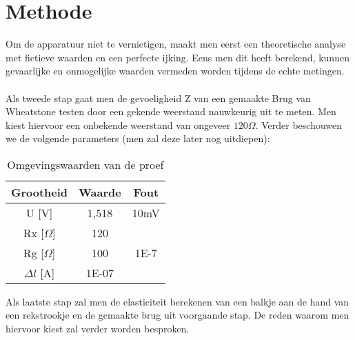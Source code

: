 \section{Methode}

Om de apparatuur niet te vernietigen, maakt men
eerst een theoretische analyse met fictieve waarden en een 
perfecte ijking. Eens men dit heeft berekend, kunnen
gevaarlijke en onmogelijke waarden vermeden worden tijdens de echte metingen.
\\ \\
Als tweede stap gaat men de gevoeligheid Z van een gemaakte Brug
van Wheatstone testen door een gekende weerstand nauwkeurig uit
te meten. Men kiest hiervoor een onbekende weerstand van
ongeveer $120 \Omega$. Verder beschouwen we de volgende parameters
(men zal deze later nog uitdiepen):

\begin{table}[h]
    \caption{Omgevingswaarden van de proef}
    \label{tab:omgevingswaarden}
    \centering
    \begin{tabular}{| c | c | c |}
        \hline
        Grootheid       & Waarde    & Fout \\ \hline
        U [V]           & 1,518     & 10mV \\ \hline
        Rx [$\Omega$]   & 120       &      \\ \hline
        Rg [$\Omega$]   & 100       & 1E-7 \\ \hline
        $\Delta l$ [A]  & 1E-07     &      \\ \hline
    \end{tabular}
\end{table}

Als laatste stap zal men de elasticiteit berekenen van
een balkje aan de hand van een rekstrookje en de gemaakte brug
uit voorgaande stap. De reden waarom men hiervoor kiest zal
verder worden besproken.

